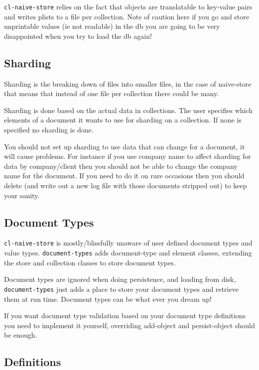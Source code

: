 \documentclass[11pt]{article}
\begin{document}
\texttt{cl-naive-store} relies on the fact that objects are translatable to
key-value pairs and writes plists to a file per collection. Note of
caution here if you go and store unprintable values (ie not readable)
in the db you are going to be very disappointed when you try to load
the db again!

\subsection{Sharding}
\label{sec:org2f0fb64}

Sharding is the breaking down of files into smaller files, in the case
of naive-store that means that instead of one file per collection there
could be many.

Sharding is done based on the actual data in collections. The user
specifies which elements of a document it wants to use for sharding on
a collection. If none is specified no sharding is done.

You should not set up sharding to use data that can change for a
document, it will cause problems. For instance if you use company
name to affect sharding for data by company/client then you should not
be able to change the company name for the document. If you need to do
it on rare occasions then you should delete (and write out a new log
file with those documents stripped out) to keep your sanity.

\subsection{Document Types}
\label{sec:orgb508a12}

\texttt{cl-naive-store} is mostly/blissfully unaware of user defined document
types and value types. \texttt{document-types} adds document-type and element
classes, extending the store and collection classes to store document
types.

Document types are ignored when doing persistence, and loading from
disk, \texttt{document-types} just adds a place to store your document
types and retrieve them at run time. Document types can be what ever
you dream up!

If you want document type validation based on your document type
definitions you need to implement it yourself, overriding add-object
and persist-object should be enough.

\subsection{Definitions}
\label{sec:org4a214b3}
\end{document}
